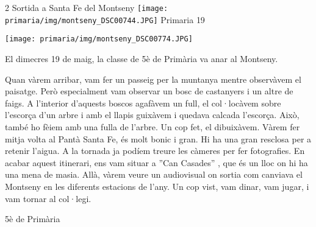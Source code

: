 \begin{news}
{2} %
{Sortida a Santa Fe del Montseny}
{\noindent\texttt{[image: primaria/img/montseny\_DSC00744.JPG]}}
{Primaria}
{19} %

{\noindent\texttt{[image: primaria/img/montseny\_DSC00774.JPG]}}

El dimecres 19 de maig,  la classe de 5è de Primària va anar al Montseny.

Quan vàrem arribar, vam fer un passeig per la muntanya mentre observàvem el paisatge. Però especialment vam observar un bosc de castanyers i un altre de faigs. A l’interior d’aquests boscos agafàvem un full, el col·locàvem sobre l’escorça d’un arbre i amb el llapis guixàvem i quedava calcada l’escorça. Això, també ho fèiem amb una fulla de l’arbre. Un cop fet, el dibuixàvem. Vàrem fer mitja volta al Pantà Santa Fe, és molt bonic i gran. Hi ha una gran resclosa per a retenir l’aigua. A la tornada ja podíem treure les càmeres per  fer fotografies. En acabar aquest itinerari, ens vam situar a ”Can Casades” , que és un lloc on hi ha una mena de masia. Allà, vàrem veure un audiovisual on sortia com canviava el Montseny en les diferents estacions de l’any. Un cop vist, vam dinar, vam jugar, i vam tornar al col·legi.  

{5è de Primària}

\end{news}
